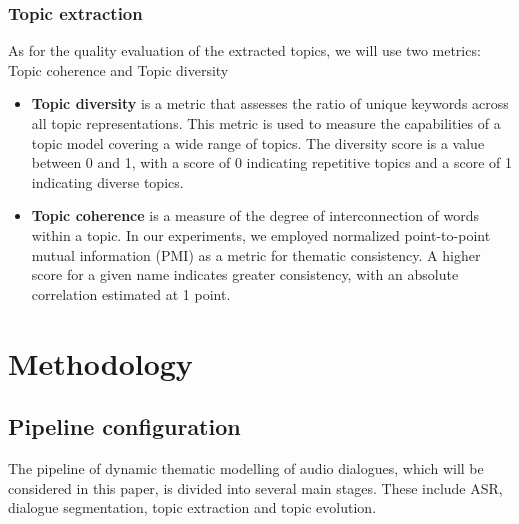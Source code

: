 \documentclass[PMI,VKR]{HSEUniversity}
\begin{document}
\subsection{Topic extraction}

As for the quality evaluation of the extracted topics, we will use two metrics: Topic coherence and Topic diversity
\begin{itemize}
    \item \textbf{Topic diversity} \cite{topicdiversity:2019} is a metric that assesses the ratio of unique keywords across all topic representations. This metric is used to measure the capabilities of a topic model covering a wide range of topics. The diversity score is a value between 0 and 1, with a score of 0 indicating repetitive topics and a score of 1 indicating diverse topics.
    \item \textbf{Topic coherence} \cite{topiccoh:2009} is a measure of the degree of interconnection of words within a topic. In our experiments, we employed normalized point-to-point mutual information (PMI) as a metric for thematic consistency. A higher score for a given name indicates greater consistency, with an absolute correlation estimated at 1 point.
\end{itemize}



\chapter{Methodology}

\section{Pipeline configuration}

The pipeline of dynamic thematic modelling of audio dialogues, which will be considered in this paper, is divided into several main stages. 
These include ASR, dialogue segmentation, topic extraction and topic evolution. 
\end{document}
